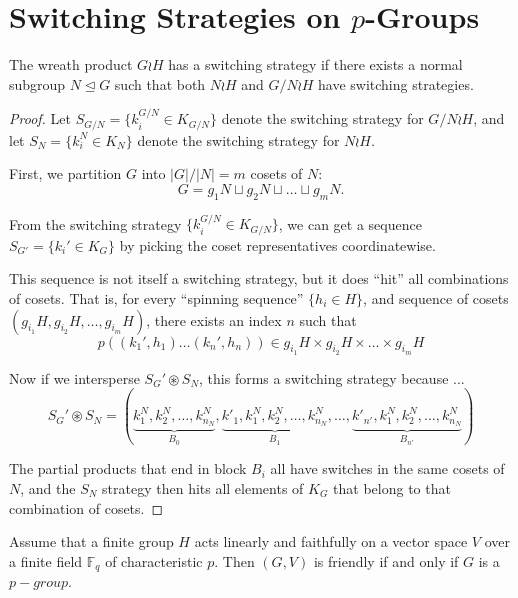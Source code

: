 \section{Switching Strategies on \texorpdfstring{$p$}{p}-Groups}
\label{sec:pGroupStrategy}
\begin{theorem}
  The wreath product $G \wr H$ has a switching strategy if there exists a
  normal subgroup $N \trianglelefteq G$ such that both $N \wr H$ and
  $G/N \wr H$ have switching strategies.
\end{theorem}
\begin{proof}
  Let $S_{G/N} = \{k_i^{G/N} \in K_{G/N}\}$ denote the switching strategy for $G/N \wr H$, and
  let $S_{N} = \{k_i^N \in K_{N}\}$ denote the switching strategy for $N \wr H$.

  First, we partition $G$ into $|G|/|N| = m$ cosets of $N$: \[
    G = g_1N \sqcup g_2N \sqcup \dots \sqcup g_mN.
  \]

  From the switching strategy $\{k_i^{G/N} \in K_{G/N}\}$,
  we can get a sequence $S_{G'} = \{k_i' \in K_G\}$
  by picking the coset representatives coordinatewise.

  This sequence is not itself a switching strategy, but it does ``hit'' all
  combinations of cosets. That is, for every ``spinning sequence'' $\{h_i \in H\}$,
  and sequence of cosets $(g_{i_1}H, g_{i_2}H, \dots, g_{i_m}H)$, there exists
  an index $n$ such that \[
    p((k_1', h_1) \dots (k_n', h_n)) \in g_{i_1}H \times g_{i_2}H \times \dots \times g_{i_m}H
  \]

  Now if we intersperse $S_G' \circledast S_N$, this forms a
  switching strategy because ... \[
    S_G' \circledast S_N = (\underbrace{k^N_1, k^N_2, \dots, k^N_{n_N}}_{B_0}, \underbrace{k'_1, k^N_1, k^N_2, \dots, k^N_{n_N}}_{B_1}, \dots, \underbrace{k'_{n'}, k^N_1, k^N_2, \dots, k^N_{n_N}}_{B_{n'}})
  \]

  The partial products that end in block $B_i$ all have switches in the same
  cosets of $N$, and the $S_N$ strategy then hits all elements of $K_G$ that
  belong to that combination of cosets.

\end{proof}
\begin{theorem} \cite{Rabinovich2022}
  Assume that a finite group $H$ acts linearly and faithfully on a vector space
  $V$ over a finite field $\mathbb F_q$ of characteristic $p$.
  Then $(G, V)$ is friendly if and only if $G$ is a $p-group$.
\end{theorem}

